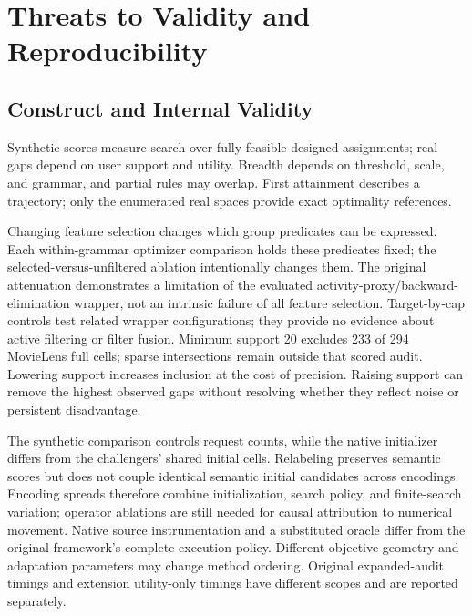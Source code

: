 \documentclass[sigconf,nonacm]{acmart}
\begin{document}
\section{Threats to Validity and Reproducibility}
\label{sec:validity}

\subsection{Construct and Internal Validity}
Synthetic scores measure search over fully feasible designed assignments; real gaps depend on user support and utility. Breadth depends on threshold, scale, and grammar, and partial rules may overlap. First attainment describes a trajectory; only the enumerated real spaces provide exact optimality references.

Changing feature selection changes which group predicates can be expressed. Each within-grammar optimizer comparison holds these predicates fixed; the selected-versus-unfiltered ablation intentionally changes them. The original attenuation demonstrates a limitation of the evaluated activity-proxy/backward-elimination wrapper, not an intrinsic failure of all feature selection. Target-by-cap controls test related wrapper configurations; they provide no evidence about active filtering or filter fusion. Minimum support 20 excludes 233 of 294 MovieLens full cells; sparse intersections remain outside that scored audit. Lowering support increases inclusion at the cost of precision. Raising support can remove the highest observed gaps without resolving whether they reflect noise or persistent disadvantage.

The synthetic comparison controls request counts, while the native initializer differs from the challengers' shared initial cells. Relabeling preserves semantic scores but does not couple identical semantic initial candidates across encodings. Encoding spreads therefore combine initialization, search policy, and finite-search variation; operator ablations are still needed for causal attribution to numerical movement. Native source instrumentation and a substituted oracle differ from the original framework's complete execution policy. Different objective geometry and adaptation parameters may change method ordering. Original expanded-audit timings and extension utility-only timings have different scopes and are reported separately.
\end{document}
